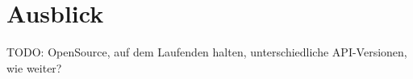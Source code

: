 \section{Ausblick}

TODO: OpenSource, auf dem Laufenden halten, unterschiedliche API-Versionen, wie weiter?
